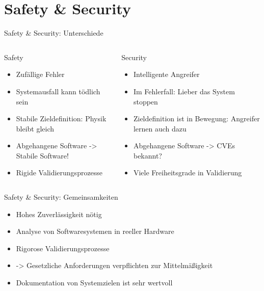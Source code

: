 \section{Safety \& Security}

\begin{frame}[T]{Safety \& Security: Unterschiede}
\small
  \begin{columns}[t,fullwidth]
   \hfill
    \begin{column}{.45\linewidth}
      \begin{block}{Safety}
      \begin{itemize}
        \item Zufällige Fehler
        \item Systemausfall kann tödlich sein
        \item Stabile Zieldefinition: Physik bleibt gleich
        \item Abgehangene Software -> Stabile Software!
        \item Rigide Validierungsprozesse
      \end{itemize}
      \end{block}
    \end{column}
    \hfill
    \begin{column}{.45\linewidth}
      \begin{block}{Security}
      \begin{itemize}
        \item Intelligente Angreifer
        \item Im Fehlerfall: Lieber das System stoppen
        \item Zieldefinition ist in Bewegung: Angreifer lernen auch dazu
        \item Abgehangene Software -> CVEs bekannt?
        \item Viele Freiheitsgrade in Validierung
      \end{itemize}
      \end{block}
    \end{column}
    \hfill
  \end{columns}
\end{frame}


\begin{frame}[T]{Safety \& Security: Gemeinsamkeiten}
  \begin{itemize}
    \item Hohes Zuverlässigkeit nötig
    \item Analyse von Softwaresystemen in reeller Hardware
    \item Rigorose Validierungsprozesse
    \item -> Gesetzliche Anforderungen verpflichten zur Mittelmäßigkeit
    \item Dokumentation von Systemzielen ist sehr wertvoll
  \end{itemize}
\end{frame}

